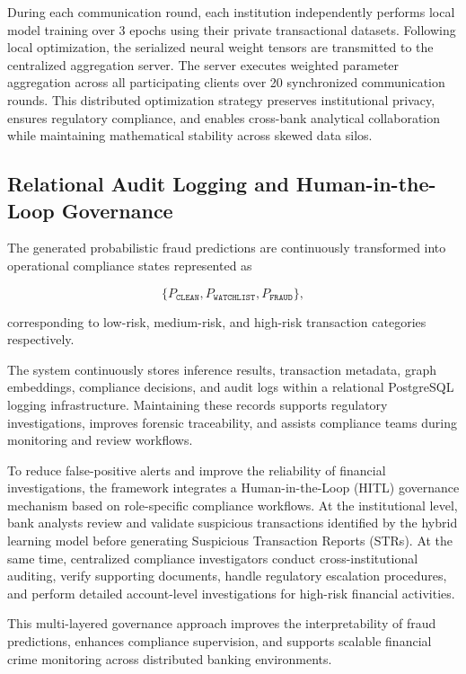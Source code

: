 \documentclass[conference]{IEEEtran}
\begin{document}
During each communication round, each institution independently performs local model training over 3 epochs using their private transactional datasets. Following local optimization, the serialized neural weight tensors are transmitted to the centralized aggregation server. The server executes weighted parameter aggregation across all participating clients over 20 synchronized communication rounds. This distributed optimization strategy preserves institutional privacy, ensures regulatory compliance, and enables cross-bank analytical collaboration while maintaining mathematical stability across skewed data silos.

\subsection{\textbf{Relational Audit Logging and Human-in-the-Loop Governance}}

The generated probabilistic fraud predictions are continuously transformed into operational compliance states represented as

\[
\{
P_{\texttt{CLEAN}},
P_{\texttt{WATCHLIST}},
P_{\texttt{FRAUD}}
\},
\]

corresponding to low-risk, medium-risk, and high-risk transaction categories respectively.

The system continuously stores inference results, transaction metadata, graph embeddings, compliance decisions, and audit logs within a relational PostgreSQL logging infrastructure. Maintaining these records supports regulatory investigations, improves forensic traceability, and assists compliance teams during monitoring and review workflows.

To reduce false-positive alerts and improve the reliability of financial investigations, the framework integrates a Human-in-the-Loop (HITL) governance mechanism based on role-specific compliance workflows. At the institutional level, bank analysts review and validate suspicious transactions identified by the hybrid learning model before generating Suspicious Transaction Reports (STRs). At the same time, centralized compliance investigators conduct cross-institutional auditing, verify supporting documents, handle regulatory escalation procedures, and perform detailed account-level investigations for high-risk financial activities.

This multi-layered governance approach improves the interpretability of fraud predictions, enhances compliance supervision, and supports scalable financial crime monitoring across distributed banking environments.
\end{document}
